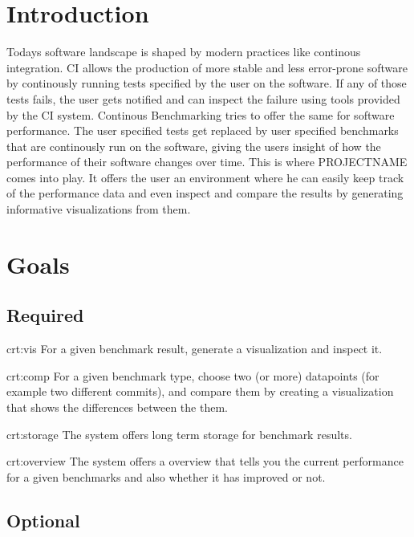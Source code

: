 \section{Introduction}

Todays software landscape is shaped by modern practices like continous integration. CI allows the production of more stable and less error-prone software by continously running tests specified by the user on the software. If any of those tests fails, the user gets notified and can inspect the failure using tools provided by the CI system. Continous Benchmarking tries to offer the same for software performance. The user specified tests get replaced by user specified benchmarks that are continously run on the software, giving the users insight of how the performance of their software changes over time. This is where PROJECTNAME comes into play. It offers the user an environment where he can easily keep track of the performance data and even inspect and compare the results by generating informative visualizations from them. 

\section{Goals}

\subsection{Required}

{crt:vis}
{For a given benchmark result, generate a \gls{visualization} and inspect it.}

{crt:comp}
{For a given benchmark type, choose two (or more) datapoints (for example two different commits), and compare them by creating a visualization that shows the differences between the them.}

{crt:storage}
{The system offers long term storage for benchmark results.}

{crt:overview}
{The system offers a overview that tells you the current performance for a given benchmarks and also whether it has improved or not.}


\subsection{Optional}

